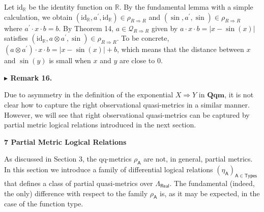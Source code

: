 \documentclass[10pt,a4paper]{amsart}
\begin{document}
 
Let $\mathrm{id}_{\mathbb{R}}$ be the identity function on $\mathbb{R}$. By the fundamental lemma with a simple calculation, we obtain $(\mathrm{id}_{\mathbb{R}},a^{\prime},\mathrm{id}_{\mathbb{R}})\in\rho_{R%
\Rightarrow R}$ and $(\sin,a^{\prime},\sin)\in\rho_{R\Rightarrow R}$ where $a^{\prime}\cdot x\cdot b=b$. By Theorem 14, $a\in\mathcal{Q}_{R\Rightarrow R}$ given by $a\cdot x\cdot b=|x-\sin(x)|$ satisfies $(\mathrm{id}_{\mathbb{R}},a\otimes a^{\prime},\sin)\in\rho_{R\Rightarrow R}$. To be concrete, $(a\otimes a^{\prime})\cdot x\cdot b=|x-\sin(x)|+b$, which means that the distance between $x$ and $\sin(y)$ is small when $x$ and $y$ are close to $0$.\par
 
 
 
 
\par\medskip\noindent\textbf{$\blacktriangleright$ Remark 16.}\par
 
 
Due to asymmetry in the definition of the exponential $X\Rightarrow Y$ in $\mathbf{Qqm}$, it is not clear how to capture the right observational quasi-metrics in a similar manner. However, we will see that right observational quasi-metrics can be captured by partial metric logical relations introduced in the next section.\par
 
 
 


 
\par\medskip\noindent\textbf{7 Partial Metric Logical Relations}\par
 
 
As discussed in Section 3, the qq-metrics $\rho_{\mathsf{A}}$ are not, in general, partial metrics. In this section we introduce a family of differential logical relations $(\eta_{\mathsf{A}})_{\mathsf{A}\in\mathsf{Types}}$ that defines a class of partial quasi-metrics over $\Lambda_{\mathsf{Real}}$. The fundamental (indeed, the only) difference with respect to the family $\rho_{\mathsf{A}}$ is, as it may be expected, in the case of the function type.\par
 
\end{document}
